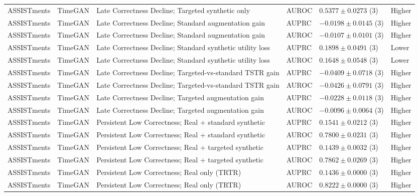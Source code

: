 \begin{longtable}{@{}p{2.25cm}p{2.05cm}p{4.7cm}p{5.0cm}p{2.6cm}p{1.25cm}@{}}
ASSISTments & TimeGAN & Late Correctness Decline; Targeted synthetic only & AUROC & $0.5377 \mathbin{\pm} 0.0273$ (3) & Higher \\
ASSISTments & TimeGAN & Late Correctness Decline; Standard augmentation gain & AUPRC & $-0.0198 \mathbin{\pm} 0.0145$ (3) & Higher \\
ASSISTments & TimeGAN & Late Correctness Decline; Standard augmentation gain & AUROC & $-0.0107 \mathbin{\pm} 0.0101$ (3) & Higher \\
ASSISTments & TimeGAN & Late Correctness Decline; Standard synthetic utility loss & AUPRC & $0.1898 \mathbin{\pm} 0.0491$ (3) & Lower \\
ASSISTments & TimeGAN & Late Correctness Decline; Standard synthetic utility loss & AUROC & $0.1648 \mathbin{\pm} 0.0548$ (3) & Lower \\
ASSISTments & TimeGAN & Late Correctness Decline; Targeted-vs-standard TSTR gain & AUPRC & $-0.0409 \mathbin{\pm} 0.0718$ (3) & Higher \\
ASSISTments & TimeGAN & Late Correctness Decline; Targeted-vs-standard TSTR gain & AUROC & $-0.0426 \mathbin{\pm} 0.0791$ (3) & Higher \\
ASSISTments & TimeGAN & Late Correctness Decline; Targeted augmentation gain & AUPRC & $-0.0228 \mathbin{\pm} 0.0118$ (3) & Higher \\
ASSISTments & TimeGAN & Late Correctness Decline; Targeted augmentation gain & AUROC & $-0.0096 \mathbin{\pm} 0.0064$ (3) & Higher \\
ASSISTments & TimeGAN & Persistent Low Correctness; Real + standard synthetic & AUPRC & $0.1541 \mathbin{\pm} 0.0212$ (3) & Higher \\
ASSISTments & TimeGAN & Persistent Low Correctness; Real + standard synthetic & AUROC & $0.7800 \mathbin{\pm} 0.0231$ (3) & Higher \\
ASSISTments & TimeGAN & Persistent Low Correctness; Real + targeted synthetic & AUPRC & $0.1439 \mathbin{\pm} 0.0032$ (3) & Higher \\
ASSISTments & TimeGAN & Persistent Low Correctness; Real + targeted synthetic & AUROC & $0.7862 \mathbin{\pm} 0.0269$ (3) & Higher \\
ASSISTments & TimeGAN & Persistent Low Correctness; Real only (TRTR) & AUPRC & $0.1436 \mathbin{\pm} 0.0000$ (3) & Higher \\
ASSISTments & TimeGAN & Persistent Low Correctness; Real only (TRTR) & AUROC & $0.8222 \mathbin{\pm} 0.0000$ (3) & Higher \\

\end{longtable}
